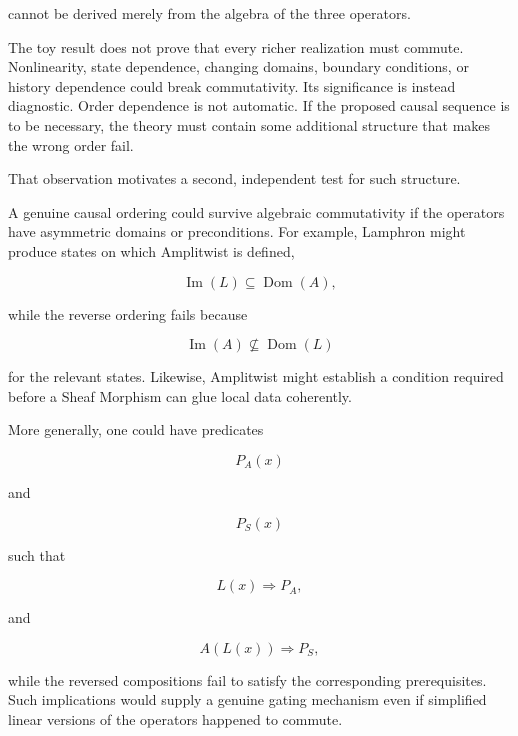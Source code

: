 \documentclass[11pt]{article}
\begin{document}
cannot be derived merely from the algebra of the three operators.

The toy result does not prove that every richer realization must commute. Nonlinearity, state dependence, changing domains, boundary conditions, or history dependence could break commutativity. Its significance is instead diagnostic. Order dependence is not automatic. If the proposed causal sequence is to be necessary, the theory must contain some additional structure that makes the wrong order fail.

That observation motivates a second, independent test for such structure.

A genuine causal ordering could survive algebraic commutativity if the operators have asymmetric domains or preconditions. For example, Lamphron might produce states on which Amplitwist is defined,

\begin{equation}
\operatorname{Im}(L)
\subseteq
\operatorname{Dom}(A),
\end{equation}

while the reverse ordering fails because

\begin{equation}
\operatorname{Im}(A)
\not\subseteq
\operatorname{Dom}(L)
\end{equation}

for the relevant states. Likewise, Amplitwist might establish a condition required before a Sheaf Morphism can glue local data coherently.

More generally, one could have predicates

\begin{equation}
P_A(x)
\end{equation}

and

\begin{equation}
P_S(x)
\end{equation}

such that

\begin{equation}
L(x)
\Longrightarrow
P_A,
\end{equation}

and

\begin{equation}
A(L(x))
\Longrightarrow
P_S,
\end{equation}

while the reversed compositions fail to satisfy the corresponding prerequisites. Such implications would supply a genuine gating mechanism even if simplified linear versions of the operators happened to commute.
\end{document}

